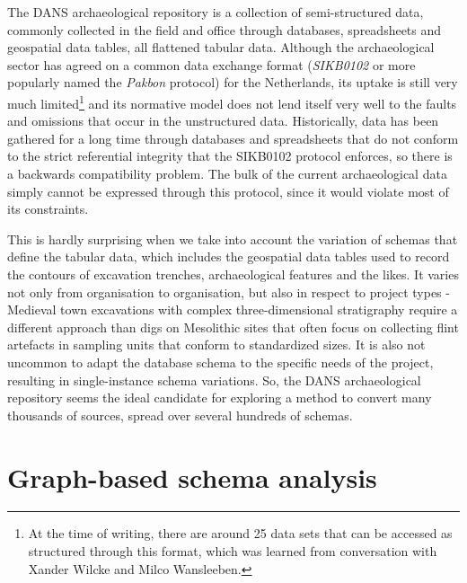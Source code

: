 \documentclass[12pt,twoside,a4paper]{article}
\begin{document}
The DANS archaeological repository is a collection of semi-structured data, commonly collected in the field and office through databases, spreadsheets and geospatial data tables, all flattened tabular data. Although the archaeological sector has agreed on a common data exchange format (\textit{SIKB0102} or more popularly named the \textit{Pakbon} protocol)\cite{digitaal-werken-in-de-archeologie} for the Netherlands, its uptake is still very much limited\footnote{At the time of writing, there are around 25 data sets that can be accessed as structured through this format, which was learned from conversation with Xander Wilcke and Milco Wansleeben.} and its normative model does not lend itself very well to the faults and omissions that occur in the unstructured data. 
Historically, data has been gathered for a long time through databases and spreadsheets that do not conform to the strict referential integrity that the SIKB0102 protocol enforces, so there is a backwards compatibility problem. The bulk of the current archaeological data simply cannot be expressed through this protocol, since it would violate most of its constraints.

This is hardly surprising when we take into account the variation of schemas that define the tabular data, which includes the geospatial data tables used to record the contours of excavation trenches, archaeological features and the likes. It varies not only from organisation to organisation, but also in respect to project types - Medieval town excavations with complex three-dimensional stratigraphy require a different approach than digs on Mesolithic sites that often focus on collecting flint artefacts in sampling units that conform to standardized sizes. It is also not uncommon to adapt the database schema to the specific needs of the project, resulting in single-instance schema variations. So, the DANS archaeological repository seems the ideal candidate for exploring a method to convert many thousands of sources, spread over several hundreds of schemas. 
\section{Graph-based schema analysis}
\end{document}
